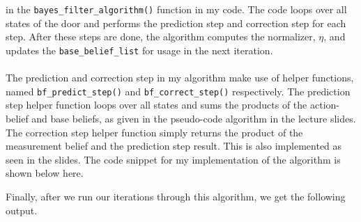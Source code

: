 \documentclass[12pt]{article}
\begin{document}
in the \lstinline{bayes_filter_algorithm()} function in my code. The code loops over
all states of the door and performs the prediction step and correction step for
each step. After these steps are done, the algorithm computes the normalizer,
$\eta$, and updates the \lstinline{base_belief_list} for usage in the next iteration.\\
\vspace{0in}\\
The prediction and correction step in my algorithm make use of helper functions,
named \lstinline{bf_predict_step()} and \lstinline{bf_correct_step()} respectively.
The prediction step helper function loops over all states and sums the products 
of the action-belief and base beliefs, as given in the pseudo-code algorithm in
the lecture slides. The correction step helper function simply returns the product
of the measurement belief and the prediction step result. This is also implemented
as seen in the slides. The code snippet for my implementation of the algorithm is
shown below here.

\vspace{0.15in}
Finally, after we run our iterations through this algorithm, we get the following
output.

\end{document}
